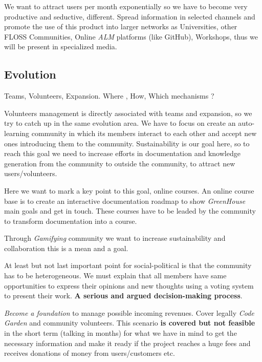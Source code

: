 \documentclass[11pt]{scrartcl}
\begin{document}
\par We want to attract users per month exponentially so we have to become very productive and seductive, different. Spread information in selected channels and promote the use of this product into larger networks as Universities, other FLOSS Communities, Online \emph{ALM} platforms (like GitHub), Workshops, thus we will be present in specialized media.


\subsection{Evolution}
\label{sub:evolution}

\par Teams, Volunteers, Expansion. Where , How, Which mechanisms ?

\par Volunteers management is directly associated with teams and expansion, so we try to catch up in the same evolution area. We have to focus on create an auto-learning community in which its members interact to each other and accept new ones introducing them to the community. Sustainability is our goal here, so to reach this goal we need to increase efforts in documentation and knowledge generation from the community to outside the community, to attract new users/volunteers. 

\par Here we want to mark a key point to this goal, online courses. An online course base is to create an interactive documentation roadmap to show \emph{GreenHouse} main goals and get in touch. These courses have to be leaded by the community to transform documentation into a course.

\par Through \emph{Gamifying} community we want to increase sustainability and collaboration this is a mean and a goal.

\par At least but not last important point for social-political is that the community has to be heterogeneous. We must explain that all members have same opportunities to express their opinions and new thoughts using a voting system to present their work. \textbf{A serious and argued decision-making process}.

\par \emph{Become a foundation} to manage possible incoming revenues. Cover legally \emph{Code Garden} and community volunteers. This scenario \textbf{is covered but not feasible} in the short term (talking in months) for what we have in mind to get the necessary information and make it ready if the project reaches a huge fees and receives donations of money from users/customers etc.
\end{document}

